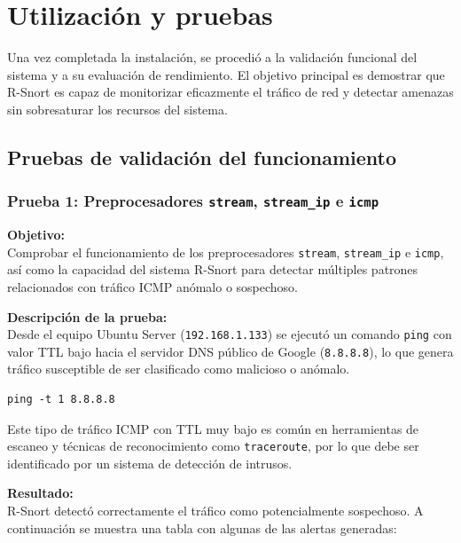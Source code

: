 \documentclass[11pt,a4paper,twoside]{report}
\begin{document}
\pagebreak



\section{Utilización y pruebas}

Una vez completada la instalación, se procedió a la validación funcional del sistema y a su evaluación de rendimiento. El objetivo principal es demostrar que R-Snort es capaz de monitorizar eficazmente el tráfico de red y detectar amenazas sin sobresaturar los recursos del sistema.

\subsection{Pruebas de validación del funcionamiento}

\subsubsection*{Prueba 1: Preprocesadores \texttt{stream}, \texttt{stream\_ip} e \texttt{icmp}}

\textbf{Objetivo:} \\
Comprobar el funcionamiento de los preprocesadores \texttt{stream}, \texttt{stream\_ip} e \texttt{icmp}, así como la capacidad del sistema R-Snort para detectar múltiples patrones relacionados con tráfico ICMP anómalo o sospechoso.\newline

\textbf{Descripción de la prueba:} \\
Desde el equipo Ubuntu Server (\texttt{192.168.1.133}) se ejecutó un comando \texttt{ping} con valor TTL bajo hacia el servidor DNS público de Google (\texttt{8.8.8.8}), lo que genera tráfico susceptible de ser clasificado como malicioso o anómalo.

\begin{lstlisting}[style=commandstyle]
	ping -t 1 8.8.8.8
\end{lstlisting}

Este tipo de tráfico ICMP con TTL muy bajo es común en herramientas de escaneo y técnicas de reconocimiento como \texttt{traceroute}, por lo que debe ser identificado por un sistema de detección de intrusos.\newline

\textbf{Resultado:} \\
R-Snort detectó correctamente el tráfico como potencialmente sospechoso. A continuación se muestra una tabla con algunas de las alertas generadas:
\end{document}
